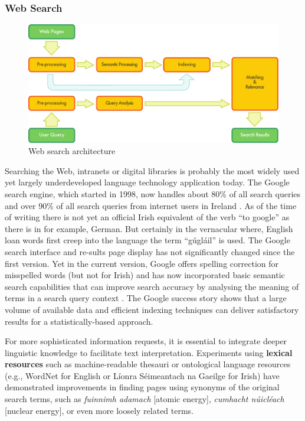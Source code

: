 \documentclass[]{../../metanetpaper}
\begin{document}
\begin{multicols}{2}
\subsubsection{Web Search}

\begin{figure}[htb]
  \center
  \includegraphics[width=\textwidth]{../_media/english/web_search_architecture}
  \caption{Web search architecture}
  \label{fig:websearcharch_en}
 \end{figure}

Searching the Web, intranets or digital libraries is probably the most widely used yet largely underdeveloped language technology application today. The Google search engine, which started in 1998, now handles about 80\% of all search queries and over 90\% of all search queries from internet users in Ireland \cite{googlemarketshare}. As of the time of writing there is not yet an official Irish equivalent of the verb ``to google'' as there is in for example, German. But certainly in the vernacular where, English loan words first creep into the language the term ``gúgláil'' \cite{kilgarriff2010} is used. The Google search interface and re-sults page display has not significantly changed since the first version. Yet in the current version, Google offers spelling correction for misspelled words (but not for Irish) and has now incorporated basic semantic search capabilities that can improve search accuracy by analysing the meaning of terms in a search query context \cite{googlesemsearch}.  The Google success story shows that a large volume of available data and efficient indexing techniques can deliver satisfactory results for a statistically-based approach. 

For more sophisticated information requests, it is essential to integrate deeper linguistic knowledge to facilitate text interpretation. Experiments using \textbf{lexical resources} such as machine-readable thesauri or ontological language resources (e.g., WordNet for English or Líonra Séimeantach na Gaeilge for Irish) have demonstrated improvements in finding pages using synonyms of the original search terms, such as \textit{fuinnimh adamach} [atomic energy], \textit{cumhacht núicléach} [nuclear energy], or even more loosely related terms. 


\end{multicols}
\end{document}
